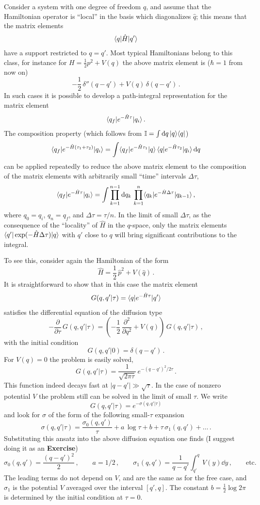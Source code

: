 Consider a system with one degree of freedom $q$, and assume that the
Hamiltonian operator is ``local'' in the basis which diagonalizes $\hat q$;
this means that the matrix elements
\[
\langle q|\hat H|q'\rangle
\]
have a support restricted to $q=q'$. Most typical Hamiltonians belong to this
class, for instance for $H=\frac12p^2+V(q)$ the above matrix element is
($\hbar=1$ from now on)
\[
-\frac12\,\delta''(q-q')+V(q)\,\delta(q-q')\,.
\]
In such cases it is possible to develop a path-integral representation for the
matrix element
\[
\langle q_f|e^{-\hat H\tau}|q_i\rangle\,.
\]
The composition property (which follows from $\mathbb{I}=\int \mathop{}\!\mathrm{d} q\,|q\rangle\langle q|$)
\[
\langle q_f|e^{-\hat H(\tau_1+\tau_2)}|q_i\rangle=\int\langle q_f|e^{-\hat H\tau_1}|q\rangle\,\langle q|e^{-\hat H\tau_2}|q_i\rangle\mathop{}\!\mathrm{d} q
\]
can be applied repeatedly to reduce the above matrix element to the
composition of the matrix elements with arbitrarily small ``time'' intervals
$\Delta\tau$,
\[
\langle q_f|e^{-\hat H\tau}|q_i\rangle=\int\prod_{k=1}^{n-1}\mathop{}\!\mathrm{d} q_k\,\prod_{k=1}^n\langle q_k|e^{-\hat H\Delta\tau}|q_{k-1}\rangle\,,
\]
where $q_0=q_i$, $q_n=q_f$, and $\Delta\tau=\tau/n$. In the limit of small
$\Delta\tau$, as the consequence of the ``locality'' of $\hat H$ in the
$q$-space, only the matrix elements $\langle q'|\exp(-\hat H\Delta\tau)|q\rangle$
with $q'$ close to $q$ will bring significant contributions to the integral.

To see this, consider again the Hamiltonian of the form
\[
\hat H=\frac12\,\hat p^2+V(\hat q)\,.
\]
It is straightforward to show that in this case the matrix element
\[
G(q,q'|\tau)=\langle q|e^{-\hat H\tau}|q'\rangle
\]
satisfies the differential equation of the diffusion type
\[
-\frac{\partial}{\partial\tau}\,G(q,q'|\tau)=\left(-\frac12\,\frac{\partial^2}{\partial q^2}+V(q)\right)\,G(q,q'|\tau)\,,
\]
with the initial condition
\[
G(q,q'|0)=\delta(q-q')\,.
\]
For $V(q)=0$ the problem is easily solved,
\[
G(q,q'|\tau)=\frac1{\sqrt{2\pi\tau}}\,e^{-(q-q')^2/2\tau}\,.
\]
This function indeed decays fast at $|q-q'|\gg\sqrt\tau$. In the case of
nonzero potential $V$ the problem still can be solved in the limit of small
$\tau$. We write
\[
G(q,q'|\tau)=e^{-\sigma(q,q'|\tau)}
\]
and look for $\sigma$ of the form of the following small-$\tau$ expansion
\[
\sigma(q,q'|\tau)=\frac{\sigma_0(q,q')}{\tau}+a\,\log\tau+b+\tau\,\sigma_1(q,q')+\dots\,.
\]
Substituting this ansatz into the above diffusion equation one finds (I
suggest doing it as an \textbf{Exercise})
\[
\sigma_0(q,q')=\frac{(q-q')^2}{2}\,,\qquad a=1/2\,,\qquad
\sigma_1(q,q')=\frac1{q-q'}\int_{q'}^qV(y)\dd y\,,\qquad\text{etc.}
\]
The leading terms do not depend on $V$, and are the same as for the free case,
and $\sigma_1$ is the potential $V$ averaged over the interval $[q',q]$. The
constant $b=\frac12\log2\pi$ is determined by the initial condition at
$\tau=0$.

